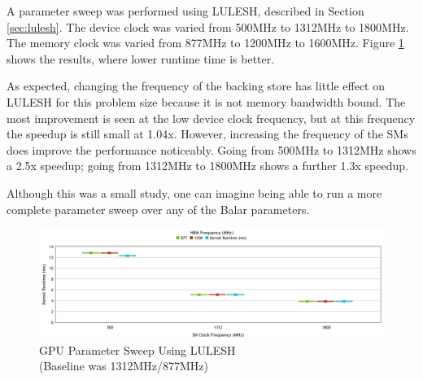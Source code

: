 A parameter sweep was performed using LULESH, described in Section
\ref{sec:lulesh}. The device clock was varied from 500MHz to 1312MHz to 1800MHz.
The memory clock was varied from 877MHz to 1200MHz to 1600MHz. Figure
\ref{fig:lulesh_sweep} shows the results, where lower runtime time is better.


As expected, changing the frequency of the backing store has little effect on
LULESH for this problem size because it is not memory bandwidth bound. The most
improvement is seen at the low device clock frequency, but at this frequency
the speedup is still small at 1.04x.
However, increasing the frequency of the SMs does improve the
performance noticeably. Going from 500MHz to 1312MHz shows a 2.5x speedup; going
from 1312MHz to 1800MHz shows a further 1.3x speedup.

Although this was a small study, one can imagine being able to run a more
complete parameter sweep over any of the Balar parameters.

   \begin{figure}[!htb]
      \centering
      \setlength{\abovecaptionskip}{6pt plus 1pt minus 1pt}
      \includegraphics[width=.98\textwidth,keepaspectratio]{figures/lulesh_sweep.png}
      \captionsetup{format=hang, justification=centering, width=.75\textwidth}
      \caption[GPU Parameter Sweep Using LULESH]{GPU Parameter Sweep Using LULESH\\(Baseline was 1312MHz/877MHz)}
      \label{fig:lulesh_sweep}
   \end{figure}


